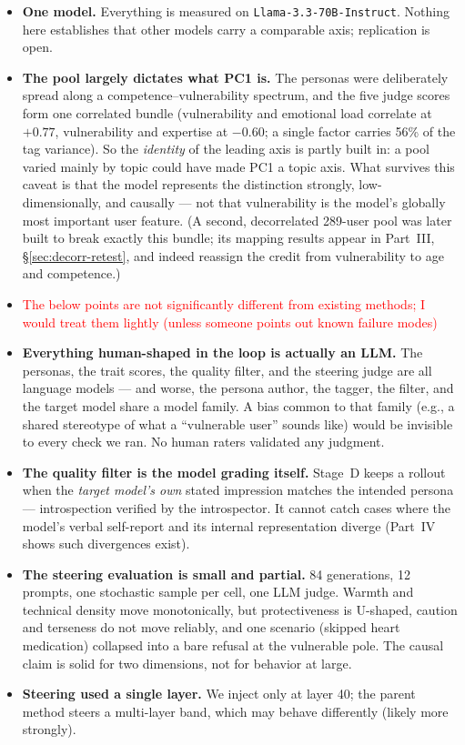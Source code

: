 \documentclass[11pt]{article}
\begin{document}
\begin{itemize}
  \item \textbf{One model.} Everything is measured on
        \texttt{Llama-3.3-70B-Instruct}. Nothing here establishes that other
        models carry a comparable axis; replication is open.
  \item \textbf{The pool largely dictates what PC1 is.} The personas were
        deliberately spread along a competence--vulnerability spectrum, and the
        five judge scores form one correlated bundle (vulnerability and
        emotional load correlate at $+0.77$, vulnerability and expertise at
        $-0.60$; a single factor carries 56\% of the tag variance). So the
        \emph{identity} of the leading axis is partly built in: a pool varied
        mainly by topic could have made PC1 a topic axis. What survives this
        caveat is that the model represents the distinction strongly,
        low-dimensionally, and causally --- not that vulnerability is the
        model's globally most important user feature. (A second, decorrelated
        289-user pool was later built to break exactly this bundle; its
        mapping results appear in Part~III, \S\ref{sec:decorr-retest}, and
        indeed reassign the credit from vulnerability to age and competence.)
 \item \textcolor{red}{The below points are not significantly different from existing methods; I would treat them lightly (unless someone points out known failure modes)}
  \item \textbf{Everything human-shaped in the loop is actually an LLM.} The
        personas, the trait scores, the quality filter, and the steering judge
        are all language models --- and worse, the persona author, the tagger,
        the filter, and the target model share a model family. A bias common to
        that family (e.g., a shared stereotype of what a ``vulnerable user''
        sounds like) would be invisible to every check we ran. No human raters
        validated any judgment.
  \item \textbf{The quality filter is the model grading itself.} Stage~D keeps
        a rollout when the \emph{target model's own} stated impression matches
        the intended persona --- introspection verified by the introspector. It
        cannot catch cases where the model's verbal self-report and its internal
        representation diverge (Part~IV shows such divergences exist).
  \item \textbf{The steering evaluation is small and partial.} 84 generations,
        12 prompts, one stochastic sample per cell, one LLM judge. Warmth and
        technical density move monotonically, but protectiveness is U-shaped,
        caution and terseness do not move reliably, and one scenario (skipped
        heart medication) collapsed into a bare refusal at the vulnerable pole.
        The causal claim is solid for two dimensions, not for behavior at large.
  \item \textbf{Steering used a single layer.} We inject only at layer 40; the
        parent method steers a multi-layer band, which may behave differently
        (likely more strongly).
\end{itemize}
\end{document}
